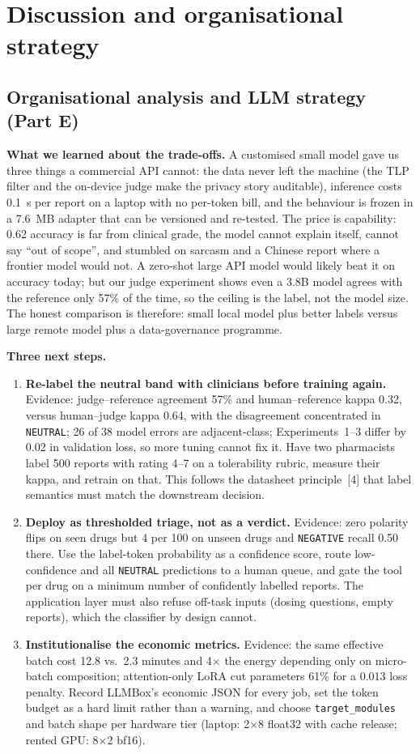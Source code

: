 \documentclass[11pt]{article}
\newcommand{\code}[1]{\texttt{#1}}
\begin{document}
\section{Discussion and organisational strategy}
\subsection{Organisational analysis and LLM strategy (Part E)}
\textbf{What we learned about the trade-offs.} A customised small model gave us three things a commercial API cannot: the data never left the machine (the TLP filter and the on-device judge make the privacy story auditable), inference costs 0.1~s per report on a laptop with no per-token bill, and the behaviour is frozen in a 7.6~MB adapter that can be versioned and re-tested. The price is capability: 0.62 accuracy is far from clinical grade, the model cannot explain itself, cannot say ``out of scope'', and stumbled on sarcasm and a Chinese report where a frontier model would not. A zero-shot large API model would likely beat it on accuracy today; but our judge experiment shows even a 3.8B model agrees with the reference only 57\% of the time, so the ceiling is the label, not the model size. The honest comparison is therefore: small local model plus better labels versus large remote model plus a data-governance programme.

\textbf{Three next steps.}
\begin{enumerate}
\item \textbf{Re-label the neutral band with clinicians before training again.} Evidence: judge--reference agreement 57\% and human--reference kappa 0.32, versus human--judge kappa 0.64, with the disagreement concentrated in \code{NEUTRAL}; 26 of 38 model errors are adjacent-class; Experiments~1--3 differ by 0.02 in validation loss, so more tuning cannot fix it. Have two pharmacists label 500 reports with rating 4--7 on a tolerability rubric, measure their kappa, and retrain on that. This follows the datasheet principle~[4] that label semantics must match the downstream decision.
\item \textbf{Deploy as thresholded triage, not as a verdict.} Evidence: zero polarity flips on seen drugs but 4 per 100 on unseen drugs and \code{NEGATIVE} recall 0.50 there. Use the label-token probability as a confidence score, route low-confidence and all \code{NEUTRAL} predictions to a human queue, and gate the tool per drug on a minimum number of confidently labelled reports. The application layer must also refuse off-task inputs (dosing questions, empty reports), which the classifier by design cannot.
\item \textbf{Institutionalise the economic metrics.} Evidence: the same effective batch cost 12.8 vs.\ 2.3 minutes and 4$\times$ the energy depending only on micro-batch composition; attention-only LoRA cut parameters 61\% for a 0.013 loss penalty. Record LLMBox's economic JSON for every job, set the token budget as a hard limit rather than a warning, and choose \code{target\_modules} and batch shape per hardware tier (laptop: 2$\times$8 float32 with cache release; rented GPU: 8$\times$2 bf16).
\end{enumerate}
\end{document}
